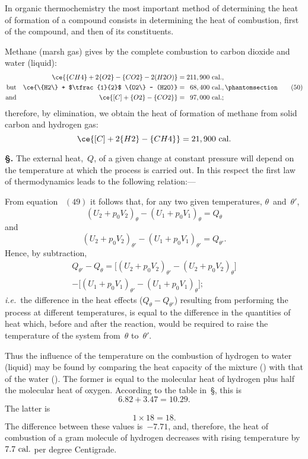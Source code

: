 \documentclass[12pt]{book}[2005/09/16]
\newcommand{\Section}[1]{
  \medskip\par\textbf{§\;#1}
  \label{section:#1}
}
\newcommand{\SecRef}[2][§\;]{\hyperref[section:#2.]{{\upshape #1#2}}}
\newcommand{\Tag}[1]{%
  \phantomsection\label{eqn:#1}\tag*{\ensuremath{#1}}%
}
\newcommand{\Eq}[1]{%
  \hyperref[eqn:#1]{\ensuremath{#1}}%
}
\newcommand{\PageSep}[1]{\ignorespaces}
\newcommand{\ie}{\emph{i.e.}}
\newcommand{\Z}{\phantom{0}}
\newcommand{\Unit}[1]{\text{\upshape #1}}
\begin{document}
In organic thermochemistry the most important method
of determining the heat of formation of a compound consists
in determining the heat of combustion, first of the compound,
and then of its constituents.

Methane (marsh gas) gives by the complete combustion
to carbon dioxide and water (liquid):
\begin{alignat*}{2}
&&\ce{\{CH4\} + 2\{O2\} - \{CO2\} - 2(H2O)} &= 211,900~\Unit{cal.}, \\
\text{but}&&
\ce{\{H2\} + $\tfrac{1}{2}$ \{O2\} - (H2O)} &= \Z68,400~\Unit{cal.},
\Tag{(50)} \\
\text{and}&&
\ce{[C] + \{O2\} - \{CO2\}} &= \Z97,000~\Unit{cal.};
\end{alignat*}
therefore, by elimination, we obtain the heat of formation
of methane from solid carbon and hydrogen gas:
\[
\ce{[C] + 2\{H2\} - \{CH4\}} = 21,900~\Unit{cal.}
\]

\Section{105.} The external heat,~$Q$, of a given change at constant
pressure will depend on the temperature at which the process
is carried out. In this respect the first law of thermodynamics
leads to the following relation:---
\PageSep{76}

From equation~\Eq{(49)} it follows that, for any two given
temperatures, $\theta$~and~$\theta'$,
\[
(U_{2} + p_{0} V_{2})_{\theta} - (U_{1} + p_{0} V_{1})_{\theta} = Q_{\theta}
\]
and
\[
(U_{2} + p_{0} V_{2})_{\theta'} - (U_{1} + p_{0} V_{1})_{\theta'} = Q_{\theta'}.
\]
Hence, by subtraction,
\begin{multline*}
Q_{\theta'} - Q_{\theta}
  = \bigl[(U_{2} + p_{0} V_{2})_{\theta'} - (U_{2} + p_{0} V_{2})_{\theta}\bigr] \\
  - \bigl[(U_{1} + p_{0} V_{1})_{\theta'} - (U_{1} + p_{0} V_{1})_{\theta}\bigr];
\end{multline*}
\ie\ the difference in the heat effects ($Q_{\theta} - Q_{\theta'}$) resulting
%
from performing the process at different temperatures, is
equal to the difference in the quantities of heat which,
before and after the reaction, would be required to raise the
temperature of the system from~$\theta$ to~$\theta'$.

Thus the influence of the temperature on the combustion
%
%
of hydrogen to water (liquid) may be found by comparing
the heat capacity of the mixture () with that of
the water (). The former is equal to the molecular
heat of hydrogen plus half the molecular heat of oxygen.
According to the table in~\SecRef{87}, this is
\[
6.82 + 3.47 = 10.29.
\]
The latter is
\[
1 × 18 = 18.
\]
The difference between these values is~$-7.71$, and, therefore,
the heat of combustion of a gram molecule of hydrogen
decreases with rising temperature by $7.7~\Unit{cal.}$ per degree
Centigrade.
\PageSep{77}
\end{document}
